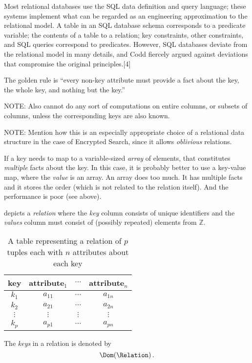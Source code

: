\documentclass[ ../main.tex]{subfiles}
\begin{document}
Most relational databases use the SQL data definition and query language; these systems implement what can be regarded as an engineering approximation to the relational model. A table in an SQL database schema corresponds to a predicate variable; the contents of a table to a relation; key constraints, other constraints, and SQL queries correspond to predicates. However, SQL databases deviate from the relational model in many details, and Codd fiercely argued against deviations that compromise the original principles.[4]

The golden rule is ``every non-key attribute must provide a fact about the key, the whole key, and nothing but the key.''


NOTE: Also cannot do any sort of computations on entire columns, or subsets of columns, unless the corresponding keys are also known.

NOTE: Mention how this is an especially appropriate choice of a relational data structure in the case of Encrypted Search, since it allows \emph{oblivious} relations.

If a key needs to map to a variable-sized \emph{array} of elements, that constitutes \emph{multiple} facts about the key. In this case, it is probably better to use a key-value map, where the \emph{value} is an array. An array does too much. It has multiple facts and it stores the order (which is not related to the relation itself). And the performance is poor (see above).


 depicts a \emph{relation} where the \emph{key} column consists of unique identifiers and the \emph{values} column must consist of (possibly repeated) elements from $\mathbb{Z}$.
\begin{table}[h]
\centering
\caption{A table representing a relation of $p$ tuples each with $n$ attributes about each key}
\label{tbl:relation}
\begin{tabular}{|c c c c|} 
\hline
key & attribute$_1$ & $\cdots$ & attribute$_n$\\
\hline
    $k_1$ & $a_{1 1}$ & $\cdots$ & $a_{1 n}$\\
    $k_2$ & $a_{2 1}$ & $\cdots$ & $a_{2 n}$\\
    $\vdots$ & $\vdots$& $\vdots$ & $\vdots$\\
    $k_p$ & $a_{p 1}$ & $\cdots$ & $a_{p n}$\\
\hline
\end{tabular}
\end{table}

The \emph{keys} in a relation is denoted by
\begin{equation}
    \Dom(\Relation)\,.
\end{equation}
\end{document}
